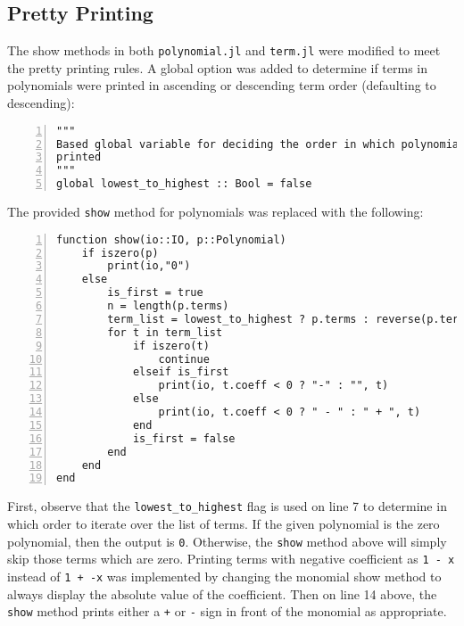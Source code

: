 \documentclass{article}
\theoremstyle{plain}
\numberwithin{theorem}{section}
\numberwithin{example}{section}
\theoremstyle{definition}
\numberwithin{definition}{section}
\begin{document}
\bigbreak

\subsection{Pretty Printing}
The show methods in both \texttt{polynomial.jl} and \texttt{term.jl} were
modified to meet the pretty printing rules. A global option was added to
determine if terms in polynomials were printed in ascending or descending term
order (defaulting to descending):

\begin{codebox}[polynomial.jl]
    \begin{Verbatim}[numbers=left,xleftmargin=5mm]
"""
Based global variable for deciding the order in which polynomial terms are
printed
"""
global lowest_to_highest :: Bool = false
    \end{Verbatim}
\end{codebox}

The provided \texttt{show} method for polynomials was replaced with the
following:

\begin{codebox}[polynomial.jl]
    \begin{Verbatim}[numbers=left,xleftmargin=5mm]
function show(io::IO, p::Polynomial) 
    if iszero(p)
        print(io,"0")
    else
        is_first = true
        n = length(p.terms)
        term_list = lowest_to_highest ? p.terms : reverse(p.terms)
        for t in term_list
            if iszero(t)
                continue
            elseif is_first
                print(io, t.coeff < 0 ? "-" : "", t)
            else
                print(io, t.coeff < 0 ? " - " : " + ", t)
            end
            is_first = false
        end
    end
end
    \end{Verbatim}
\end{codebox}

First, observe that the \texttt{lowest\_to\_highest} flag is used on line 7 to
determine in which order to iterate over the list of terms. If the given
polynomial is the zero polynomial, then the output is \texttt{0}. Otherwise, the
\texttt{show} method above will simply skip those terms which are zero.
Printing terms with negative coefficient as \texttt{1 - x} instead of
\texttt{1 + -x} was implemented by changing the monomial show method to always
display the absolute value of the coefficient. Then on line 14 above, the
\texttt{show} method prints either a \texttt{+} or \texttt{-} sign in front of
the monomial as appropriate. \medbreak
\end{document}
